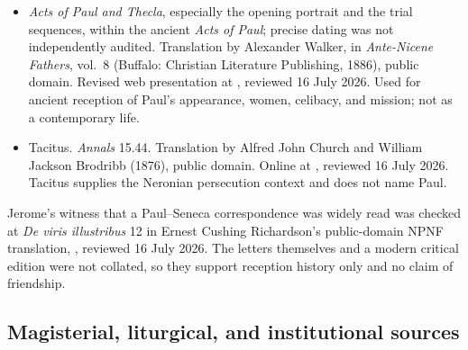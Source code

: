 \begin{itemize}
\item \emph{Acts of Paul and Thecla}, especially the opening portrait and the
  trial sequences, within the ancient \emph{Acts of Paul}; precise dating was
  not independently audited.
  Translation by Alexander Walker, in \emph{Ante-Nicene Fathers}, vol.~8
  (Buffalo: Christian Literature Publishing, 1886), public domain. Revised
  web presentation at
  ,
  reviewed 16 July 2026. Used for ancient reception of Paul's appearance,
  women, celibacy, and mission; not as a contemporary life.

\item Tacitus. \emph{Annals} 15.44. Translation by Alfred John Church and
  William Jackson Brodribb (1876), public domain. Online at
  ,
  reviewed 16 July 2026. Tacitus supplies the Neronian persecution context and
  does not name Paul.
\end{itemize}

Jerome's witness that a Paul--Seneca correspondence was widely read was checked
at \emph{De viris illustribus} 12 in Ernest Cushing Richardson's public-domain
NPNF translation,
, reviewed
16 July 2026. The letters themselves and a modern critical edition were not
collated, so they support reception history only and no claim of friendship.

\subsection{Magisterial, liturgical, and institutional sources}

